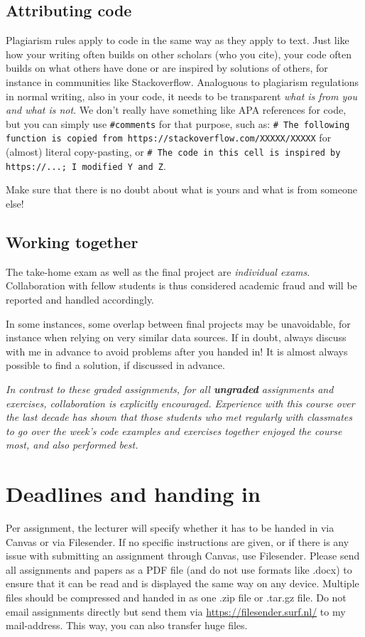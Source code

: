 \documentclass[a4paper,10pt,twocolumn]{report}
\begin{document}
\subsection{Attributing code}
Plagiarism rules apply to code in the same way as they apply to text. Just like how your writing often builds on other scholars (who you cite), your code often builds on what others have done or are inspired by solutions of others, for instance in communities like Stackoverflow. Analoguous to plagiarism regulations in normal writing, also in your code, it needs to be transparent \emph{what is from you and what is not}. We don't really have something like APA references for code, but you can simply use \texttt{\#comments} for that purpose, such as:
\texttt{\# The following function is copied from https://stackoverflow.com/XXXXX/XXXXX} for (almost) literal copy-pasting, or \texttt{\# The code in this cell is inspired by https://...; I modified Y and Z}. 

Make sure that there is no doubt about what is yours and what is from someone else!

\subsection{Working together}
The take-home exam as well as the final project are \emph{individual exams}. Collaboration with fellow students is thus considered academic fraud and will be reported and handled accordingly.

In some instances, some overlap between final projects may be unavoidable, for instance when relying on very similar data sources. If in doubt, always discuss with me in advance to avoid problems after you handed in! It is almost always possible to find a solution, if discussed in advance.

\emph{In contrast to these graded assignments, for all \textbf{ungraded} assignments and exercises, collaboration is explicitly encouraged. Experience with this course over the last decade has shown that those students who met regularly with classmates to go over the week's code examples and exercises together enjoyed the course most, and also performed best.}


\section{Deadlines and handing in}
Per assignment, the lecturer will specify whether it has to be handed in via Canvas or via Filesender. If no specific instructions are given, or if there is any issue with submitting an assignment through Canvas, use Filesender. Please send all assignments and papers as a PDF file (and do not use formats like .docx) to ensure that it can be read and is displayed the same way on any device. Multiple files should be compressed and handed in as one .zip file or .tar.gz file. Do not email assignments directly but send them via \url{https://filesender.surf.nl/} to my mail-address. This way, you can also transfer huge files.
\end{document}
